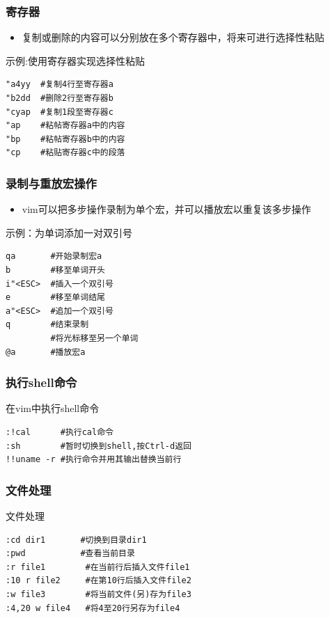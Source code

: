 \documentclass[xcolor=svgnames,presentation]{beamer}
\begin{document}
\begin{frame}[fragile]
\frametitle{寄存器}
\label{sec-4-6-3}
\begin{itemize}

\item 复制或删除的内容可以分别放在多个寄存器中，将来可进行选择性粘贴
\label{sec-4-6-3-1}%
\end{itemize} %
\begin{exampleblock}{示例:使用寄存器实现选择性粘贴}
\label{sec-4-6-3-2}


\begin{verbatim}
"a4yy  #复制4行至寄存器a
"b2dd  #删除2行至寄存器b
"cyap  #复制1段至寄存器c
"ap    #粘帖寄存器a中的内容
"bp    #粘帖寄存器b中的内容
"cp    #粘贴寄存器c中的段落
\end{verbatim}
\end{exampleblock}
\end{frame}
\begin{frame}[fragile]
\frametitle{录制与重放宏操作}
\label{sec-4-6-4}
\begin{itemize}

\item vim可以把多步操作录制为单个宏，并可以播放宏以重复该多步操作
\label{sec-4-6-4-1}%
\end{itemize} %
\begin{exampleblock}{示例：为单词添加一对双引号}
\label{sec-4-6-4-2}


\begin{verbatim}
qa       #开始录制宏a
b        #移至单词开头
i"<ESC>  #插入一个双引号
e        #移至单词结尾
a"<ESC>  #追加一个双引号
q        #结束录制
         #将光标移至另一个单词
@a       #播放宏a
\end{verbatim}
\end{exampleblock}
\end{frame}
\begin{frame}[fragile]
\frametitle{执行shell命令}
\label{sec-4-6-5}
\begin{exampleblock}{在vim中执行shell命令}
\label{sec-4-6-5-1}


\begin{verbatim}
:!cal      #执行cal命令
:sh        #暂时切换到shell,按Ctrl-d返回
!!uname -r #执行命令并用其输出替换当前行
\end{verbatim}
\end{exampleblock}
\end{frame}
\begin{frame}[fragile]
\frametitle{文件处理}
\label{sec-4-6-6}
\begin{exampleblock}{文件处理}
\label{sec-4-6-6-1}


\begin{verbatim}
:cd dir1       #切换到目录dir1
:pwd           #查看当前目录
:r file1        #在当前行后插入文件file1
:10 r file2     #在第10行后插入文件file2
:w file3        #将当前文件(另)存为file3
:4,20 w file4   #将4至20行另存为file4
\end{verbatim}
\end{exampleblock}
\end{frame}
\end{document}
